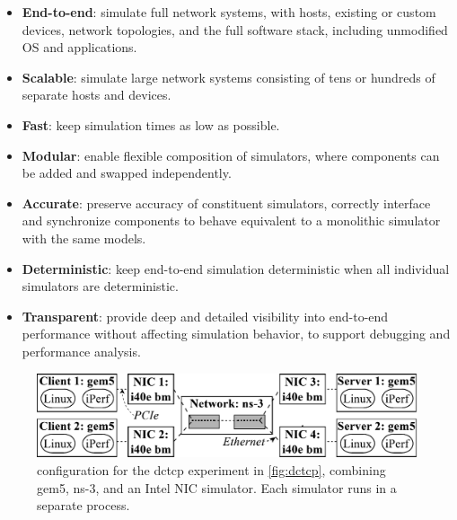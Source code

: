 \begin{itemize}
  \item \textbf{End-to-end}: simulate full network systems,
    with hosts, existing or custom devices, network topologies, and
    the full software stack, including unmodified OS and applications.
  \item \textbf{Scalable}: simulate large network systems consisting
    of tens or hundreds of separate hosts and devices.
  \item \textbf{Fast}: keep simulation times as low as possible.
  \item \textbf{Modular}: enable flexible composition of simulators, where
    components can be added and swapped independently.
  \item \textbf{Accurate}: preserve accuracy of constituent
    simulators, correctly interface and synchronize components to
    behave equivalent to a monolithic simulator with the same
    models.
  \item \textbf{Deterministic}: keep end-to-end simulation
    deterministic when all individual simulators are deterministic.
  \item \textbf{Transparent}: provide deep and detailed visibility
    into end-to-end performance without affecting simulation behavior,
    to support debugging and performance analysis.
\end{itemize}


\begin{figure}[t]%
\centering%
\includegraphics[width=\columnwidth]{figures/dctcp_setup}%
\caption{\sysname configuration for the dctcp experiment in
  \autoref{fig:dctcp}, combining gem5, ns-3, and an Intel NIC
  simulator. Each simulator runs in a separate process.}%
\label{fig:dctcp-setup}%
\end{figure}



